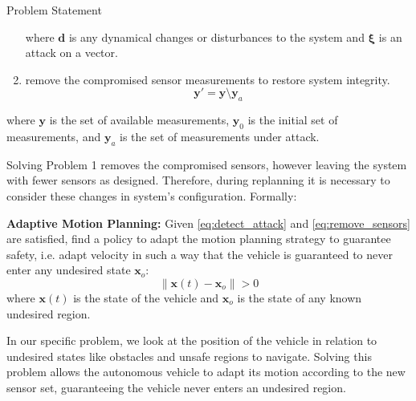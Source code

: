 \begin{section}{Problem Statement}
\begin{problem}
\begin{enumerate}
\begin{equation}
	\end{equation}
where $\bm{d}$ is any dynamical changes or disturbances to the system and $\bm{\xi}$ is an attack on a vector.
	\item remove the compromised sensor measurements to restore system integrity.
	 \vspace{-10pt}
	\begin{equation}
	\label{eq:remove_sensors}
	    \bm{y}'=\bm{y} \setminus \bm{y}_a
	\end{equation}
\end{enumerate}
where $\bm{y}$ is the set of available measurements, $\bm{y}_0$ is the initial set of measurements, and $\bm{y}_a$ is the set of measurements under attack.


\end{problem}
Solving Problem 1 removes the compromised sensors, however leaving the system with fewer sensors as designed. Therefore, during replanning it is necessary to consider these changes in system's configuration. Formally:
	
\begin{problem} \label{problem2} {\textbf{Adaptive Motion Planning:}}
Given \eqref{eq:detect_attack} and \eqref{eq:remove_sensors} are satisfied, find a policy to adapt the motion planning strategy to guarantee safety, i.e. adapt velocity in such a way that the vehicle is guaranteed to never enter any undesired state $\bm{x}_o$:  
	\begin{equation}
		\lVert {\bm{x}(t)-\bm{x}_o} \rVert > 0
	\end{equation}
where $\bm{x}(t)$ is the state of the vehicle and $\bm{x}_o$ is the state of any known undesired region.
	\end{problem}

In our specific problem, we look at the position of the vehicle in relation to undesired states like obstacles and unsafe regions to navigate. Solving this problem allows the autonomous vehicle to adapt its motion according to the new sensor set, guaranteeing the vehicle never enters an undesired region.
\end{section}